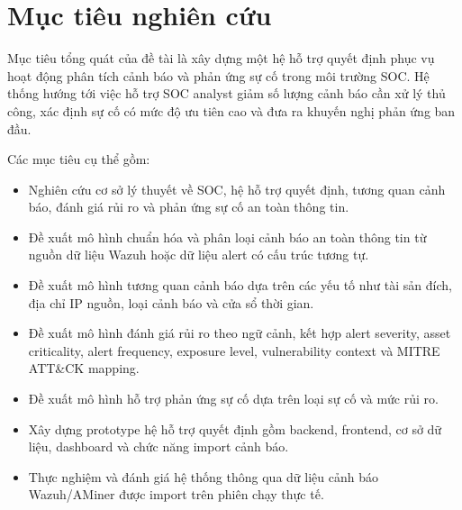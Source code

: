 \documentclass[a4paper,12pt,oneside]{book}
\begin{document}
\section{Mục tiêu nghiên cứu}
{\fontsize{13pt}{15.6pt}\selectfont

Mục tiêu tổng quát của đề tài là xây dựng một hệ hỗ trợ quyết định phục vụ hoạt động phân tích cảnh báo và phản ứng sự cố trong môi trường SOC. Hệ thống hướng tới việc hỗ trợ SOC analyst giảm số lượng cảnh báo cần xử lý thủ công, xác định sự cố có mức độ ưu tiên cao và đưa ra khuyến nghị phản ứng ban đầu.

\noindent Các mục tiêu cụ thể gồm:

\begin{itemize}
    \item Nghiên cứu cơ sở lý thuyết về SOC, hệ hỗ trợ quyết định, tương quan cảnh báo, đánh giá rủi ro và phản ứng sự cố an toàn thông tin.
    \item Đề xuất mô hình chuẩn hóa và phân loại cảnh báo an toàn thông tin từ nguồn dữ liệu Wazuh hoặc dữ liệu alert có cấu trúc tương tự.
    \item Đề xuất mô hình tương quan cảnh báo dựa trên các yếu tố như tài sản đích, địa chỉ IP nguồn, loại cảnh báo và cửa sổ thời gian.
    \item Đề xuất mô hình đánh giá rủi ro theo ngữ cảnh, kết hợp alert severity, asset criticality, alert frequency, exposure level, vulnerability context và MITRE ATT\&CK mapping.
    \item Đề xuất mô hình hỗ trợ phản ứng sự cố dựa trên loại sự cố và mức rủi ro.
    \item Xây dựng prototype hệ hỗ trợ quyết định gồm backend, frontend, cơ sở dữ liệu, dashboard và chức năng import cảnh báo.
    \item Thực nghiệm và đánh giá hệ thống thông qua dữ liệu cảnh báo Wazuh/AMiner được import trên phiên chạy thực tế.
\end{itemize}

}
\end{document}
